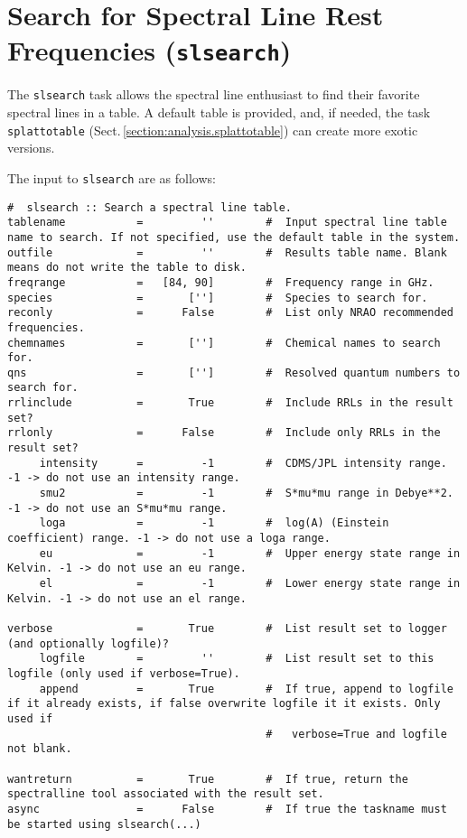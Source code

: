 \section{Search for Spectral Line Rest Frequencies ({\tt slsearch})}
\label{section:analysis.slsearch}

The {\tt slsearch} task allows the spectral line enthusiast to find their
favorite spectral lines in a table. A default table is provided, and,
if needed, the task {\tt splattotable}
(Sect.\,\ref{section:analysis.splattotable}) can create more exotic
versions.

The input to {\tt slsearch} are as follows:  

\small
\begin{verbatim}
#  slsearch :: Search a spectral line table.
tablename           =         ''        #  Input spectral line table name to search. If not specified, use the default table in the system.
outfile             =         ''        #  Results table name. Blank means do not write the table to disk.
freqrange           =   [84, 90]        #  Frequency range in GHz.
species             =       ['']        #  Species to search for.
reconly             =      False        #  List only NRAO recommended frequencies.
chemnames           =       ['']        #  Chemical names to search for.
qns                 =       ['']        #  Resolved quantum numbers to search for.
rrlinclude          =       True        #  Include RRLs in the result set?
rrlonly             =      False        #  Include only RRLs in the result set?
     intensity      =         -1        #  CDMS/JPL intensity range. -1 -> do not use an intensity range.
     smu2           =         -1        #  S*mu*mu range in Debye**2. -1 -> do not use an S*mu*mu range.
     loga           =         -1        #  log(A) (Einstein coefficient) range. -1 -> do not use a loga range.
     eu             =         -1        #  Upper energy state range in Kelvin. -1 -> do not use an eu range.
     el             =         -1        #  Lower energy state range in Kelvin. -1 -> do not use an el range.

verbose             =       True        #  List result set to logger (and optionally logfile)?
     logfile        =         ''        #  List result set to this logfile (only used if verbose=True).
     append         =       True        #  If true, append to logfile if it already exists, if false overwrite logfile it it exists. Only used if
                                        #   verbose=True and logfile not blank.

wantreturn          =       True        #  If true, return the spectralline tool associated with the result set.
async               =      False        #  If true the taskname must be started using slsearch(...)
\end{verbatim}
\normalsize


